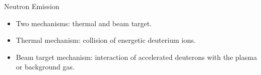 \begin{frame} {Neutron Emission}
    \begin{itemize}
        \item Two mechanisms: thermal and beam target.
        \item Thermal mechanism: collision of energetic deuterium ions.
        \item Beam target mechanism: interaction of accelerated deuterons with the plasma or background gas.
    \end{itemize}
\end{frame}